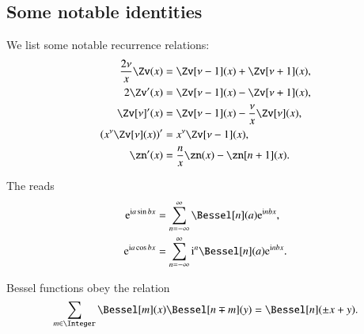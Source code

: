     \subsection{Some notable identities}
    We list some notable recurrence relations:
    \begin{subequations}
        \begin{align}
            \frac{2\nu}{x}\Zv(x) &= \Zv[\nu-1](x) + \Zv[\nu+1](x), \label{eq:derivations:cylinder:recurr_Z_plus}\\
            2\Zv'(x) &= \Zv[\nu-1](x) - \Zv[\nu+1](x),\label{eq:derivations:cylinder:recurr_Z_minus} \\
            \Zv[\nu]'(x) &= \Zv[\nu-1](x) - \frac{\nu}{x}\Zv[\nu](x),\label{eq:derivations:cylinder:recurr_Z_minus_vol2} \\
            \pclosed{x^\nu \Zv[\nu](x)}' &= x^\nu \Zv[\nu-1] (x),\label{eq:derivations:cylinder:der_idk_Z_123} \\
            \zn'(x) &= \frac{n}{x}\zn(x) -\zn[n+1](x).
        \end{align}
    \end{subequations}

    The  reads
    \begin{subequations}\label{eq:cylinder:Jacobi_Anger}
        \begin{align}
            \eu[\im a \sin{bx}]  &= \sum_{n=-\infty}^{\infty} \Bessel[n](a) \eu[\im n bx],\label{eq:cylinder:Jacobi_Anger_sin} \\
            \eu[\im a \cos{bx}]  &= \sum_{n=-\infty}^{\infty} \im^{n}\Bessel[n](a) \eu[\im n bx] \label{eq:cylinder:Jacobi_Anger_cos}.
        \end{align}
    \end{subequations}

    Bessel functions obey the relation
    \begin{equation}\label{eq:cylinder:Bessel_sum_relation}
        \sum_{m\in \Integer} \Bessel[m](x) \Bessel[n\mp m](y) = \Bessel[n](\pm x+y).
    \end{equation}



